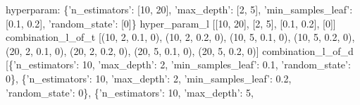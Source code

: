 \documentclass[11pt]{article}
\newenvironment{Shaded}{}{}
\newcommand{\DataTypeTok}[1]{\textcolor[rgb]{0.56,0.13,0.00}{{#1}}}
\newcommand{\DecValTok}[1]{\textcolor[rgb]{0.25,0.63,0.44}{{#1}}}
\newcommand{\FloatTok}[1]{\textcolor[rgb]{0.25,0.63,0.44}{{#1}}}
\newcommand{\CharTok}[1]{\textcolor[rgb]{0.25,0.44,0.63}{{#1}}}
\newcommand{\NormalTok}[1]{{#1}}
\newcommand{\AttributeTok}[1]{\textcolor[rgb]{0.49,0.56,0.16}{{#1}}}
\begin{document}
\begin{Shaded}
\begin{Highlighting}[]
\NormalTok{hyperparam:}
\NormalTok{\{}\CharTok{'n_estimators'}\NormalTok{: [}\DecValTok{10}\NormalTok{, }\DecValTok{20}\NormalTok{],}
 \CharTok{'max_depth'}\NormalTok{: [}\DecValTok{2}\NormalTok{, }\DecValTok{5}\NormalTok{],}
 \CharTok{'min_samples_leaf'}\NormalTok{: [}\FloatTok{0.1}\NormalTok{, }\FloatTok{0.2}\NormalTok{],}
 \CharTok{'random_state'}\NormalTok{: [}\DecValTok{0}\NormalTok{]\}}
\NormalTok{hyper_param_l}
\NormalTok{[[}\AttributeTok{10}\NormalTok{, }\AttributeTok{20}\NormalTok{], [}\AttributeTok{2}\NormalTok{, }\AttributeTok{5}\NormalTok{], [}\AttributeTok{0}\NormalTok{.}\AttributeTok{1}\NormalTok{, }\AttributeTok{0}\NormalTok{.}\AttributeTok{2}\NormalTok{], [}\AttributeTok{0}\NormalTok{]]}
\DataTypeTok{combination_l_of_t}
\NormalTok{[(}\DecValTok{10}\NormalTok{, }\DecValTok{2}\NormalTok{, }\FloatTok{0.1}\NormalTok{, }\DecValTok{0}\NormalTok{),}
\NormalTok{ (}\DecValTok{10}\NormalTok{, }\DecValTok{2}\NormalTok{, }\FloatTok{0.2}\NormalTok{, }\DecValTok{0}\NormalTok{),}
\NormalTok{ (}\DecValTok{10}\NormalTok{, }\DecValTok{5}\NormalTok{, }\FloatTok{0.1}\NormalTok{, }\DecValTok{0}\NormalTok{),}
\NormalTok{ (}\DecValTok{10}\NormalTok{, }\DecValTok{5}\NormalTok{, }\FloatTok{0.2}\NormalTok{, }\DecValTok{0}\NormalTok{),}
\NormalTok{ (}\DecValTok{20}\NormalTok{, }\DecValTok{2}\NormalTok{, }\FloatTok{0.1}\NormalTok{, }\DecValTok{0}\NormalTok{),}
\NormalTok{ (}\DecValTok{20}\NormalTok{, }\DecValTok{2}\NormalTok{, }\FloatTok{0.2}\NormalTok{, }\DecValTok{0}\NormalTok{),}
\NormalTok{ (}\DecValTok{20}\NormalTok{, }\DecValTok{5}\NormalTok{, }\FloatTok{0.1}\NormalTok{, }\DecValTok{0}\NormalTok{),}
\NormalTok{ (}\DecValTok{20}\NormalTok{, }\DecValTok{5}\NormalTok{, }\FloatTok{0.2}\NormalTok{, }\DecValTok{0}\NormalTok{)]}
\NormalTok{combination_l_of_d}
\NormalTok{[\{}\CharTok{'n_estimators'}\NormalTok{: }\DecValTok{10}\NormalTok{,}
  \CharTok{'max_depth'}\NormalTok{: }\DecValTok{2}\NormalTok{,}
  \CharTok{'min_samples_leaf'}\NormalTok{: }\FloatTok{0.1}\NormalTok{,}
  \CharTok{'random_state'}\NormalTok{: }\DecValTok{0}\NormalTok{\},}
\NormalTok{ \{}\CharTok{'n_estimators'}\NormalTok{: }\DecValTok{10}\NormalTok{,}
  \CharTok{'max_depth'}\NormalTok{: }\DecValTok{2}\NormalTok{,}
  \CharTok{'min_samples_leaf'}\NormalTok{: }\FloatTok{0.2}\NormalTok{,}
  \CharTok{'random_state'}\NormalTok{: }\DecValTok{0}\NormalTok{\},}
\NormalTok{ \{}\CharTok{'n_estimators'}\NormalTok{: }\DecValTok{10}\NormalTok{,}
  \CharTok{'max_depth'}\NormalTok{: }\DecValTok{5}\NormalTok{,}

\end{Highlighting}
\end{Shaded}
\end{document}
